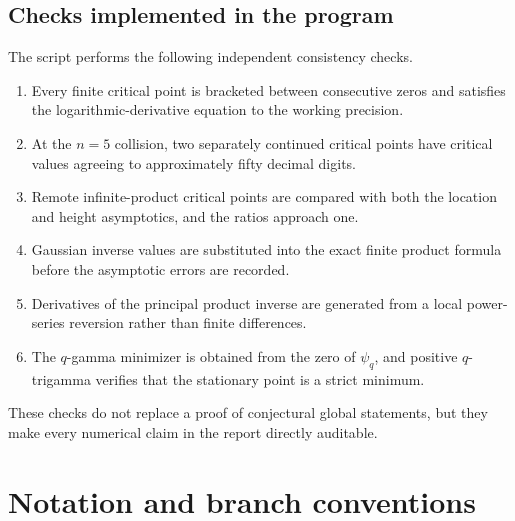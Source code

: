 \documentclass[11pt,oneside]{article}
\theoremstyle{definition}
\theoremstyle{remark}
\theoremstyle{plain}
\theoremstyle{definition}
\theoremstyle{remark}
\numberwithin{equation}{section}
\numberwithin{figure}{section}
\numberwithin{table}{section}
\let\reporttopsection\section
\let\reportsubsection\subsection
\let\reportsubsubsection\subsubsection
\let\chapter\reporttopsection
\let\section\reportsubsection
\let\subsection\reportsubsubsection
\begin{document}
\section{Checks implemented in the program}
The script performs the following independent consistency checks.
\begin{enumerate}[label=(\roman*)]
\item Every finite critical point is bracketed between consecutive zeros and
satisfies the logarithmic-derivative equation to the working precision.
\item At the \(n=5\) collision, two separately continued critical points have
critical values agreeing to approximately fifty decimal digits.
\item Remote infinite-product critical points are compared with both the
location and height asymptotics, and the ratios approach one.
\item Gaussian inverse values are substituted into the exact finite product
formula before the asymptotic errors are recorded.
\item Derivatives of the principal product inverse are generated from a local
power-series reversion rather than finite differences.
\item The \(q\)-gamma minimizer is obtained from the zero of \(\psi_q\), and
positive \(q\)-trigamma verifies that the stationary point is a strict
minimum.
\end{enumerate}
These checks do not replace a proof of conjectural global statements, but they
make every numerical claim in the report directly auditable.

\chapter{Notation and branch conventions}
\label{app:notation}
\end{document}
